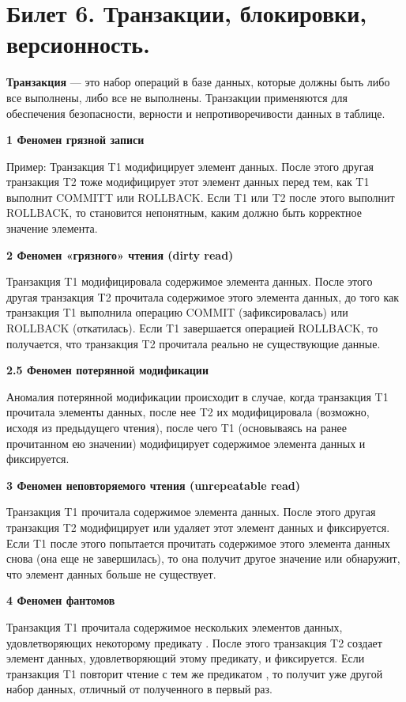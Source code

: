 \newpage
\section {Билет 6. Транзакции, блокировки, версионность.}


\textbf{Транзакция} — это набор операций в базе данных, которые должны быть либо все выполнены, либо все не выполнены. Транзакции применяются для обеспечения безопасности, верности и непротиворечивости данных в таблице.

\textbf{1 Феномен грязной записи}

Пример: Транзакция T1 модифицирует элемент данных. После этого другая транзакция T2 тоже модифицирует этот элемент данных перед тем, как T1 выполнит COMMITT или ROLLBACK. Если T1 или T2 после этого выполнит ROLLBACK, то становится непонятным, каким должно быть корректное значение элемента.

\textbf{2 Феномен «грязного» чтения (dirty read)}

Транзакция T1 модифицировала содержимое элемента данных. После этого другая транзакция T2 прочитала содержимое этого элемента данных, до того как транзакция T1 выполнила операцию COMMIT (зафиксировалась) или ROLLBACK (откатилась). Если T1 завершается операцией ROLLBACK, то получается, что транзакция T2 прочитала реально не существующие данные.


\textbf{2.5 Феномен потерянной модификации}

Аномалия потерянной модификации происходит в случае, когда транзакция T1 прочитала элементы данных, после нее T2 их модифицировала (возможно, исходя из предыдущего чтения), после чего T1 (основываясь на ранее прочитанном ею значении) модифицирует содержимое элемента данных и фиксируется.

\textbf{3 Феномен неповторяемого чтения (unrepeatable read)}

Транзакция T1 прочитала содержимое элемента данных. После этого другая транзакция T2 модифицирует или удаляет этот элемент данных и фиксируется. Если T1 после этого попытается прочитать содержимое этого элемента данных снова (она еще не завершилась), то она получит другое значение или обнаружит, что элемент данных больше не существует.

\textbf{4 Феномен фантомов}

Транзакция T1 прочитала содержимое нескольких элементов данных, удовлетворяющих некоторому предикату . После этого транзакция T2 создает элемент данных, удовлетворяющий этому предикату, и фиксируется. Если транзакция T1 повторит чтение с тем же предикатом , то получит уже другой набор данных, отличный от полученного в первый раз.

